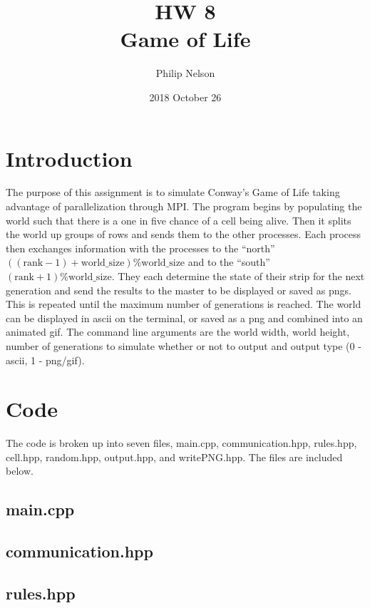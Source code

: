\documentclass{article}
\title{HW 8 \\ Game of Life}
\author{Philip Nelson}
\date{2018 October 26}
\begin{document}
\maketitle

\section*{Introduction}

The purpose of this assignment is to simulate Conway's Game of Life taking advantage of parallelization through MPI. The program begins by populating the world such that there is a one in five chance of a cell being alive. Then it splits the world up groups of rows and sends them to the other processes. Each process then exchanges information with the processes to the ``north'' $((\text{rank} - 1) + \text{world\_size}) \% \text{world\_size}$ and to the ``south'' $(\text{rank} + 1) \% \text{world\_size}$. They each determine the state of their strip for the next generation and send the results to the master to be displayed or saved as pngs. This is repeated until the maximum number of generations is reached. The world can be displayed in ascii on the terminal, or saved as a png and combined into an animated gif. The command line arguments are the world width, world height, number of generations to simulate whether or not to output and output type (0 - ascii, 1 - png/gif).

\section*{Code}
The code is broken up into seven files, main.cpp, communication.hpp, rules.hpp, cell.hpp, random.hpp, output.hpp, and writePNG.hpp. The files are included below.

\bigskip

\subsection{main.cpp}


\subsection{communication.hpp}


\subsection{rules.hpp}

\end{document}

